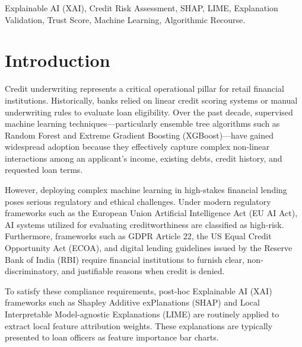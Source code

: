 \documentclass[conference]{IEEEtran}
\begin{document}
\begin{IEEEkeywords}
Explainable AI (XAI), Credit Risk Assessment, SHAP, LIME, Explanation Validation, Trust Score, Machine Learning, Algorithmic Recourse.
\end{IEEEkeywords}

\section{Introduction}
Credit underwriting represents a critical operational pillar for retail financial institutions. Historically, banks relied on linear credit scoring systems or manual underwriting rules to evaluate loan eligibility. Over the past decade, supervised machine learning techniques---particularly ensemble tree algorithms such as Random Forest and Extreme Gradient Boosting (XGBoost)---have gained widespread adoption because they effectively capture complex non-linear interactions among an applicant's income, existing debts, credit history, and requested loan terms.

However, deploying complex machine learning in high-stakes financial lending poses serious regulatory and ethical challenges. Under modern regulatory frameworks such as the European Union Artificial Intelligence Act (EU AI Act), AI systems utilized for evaluating creditworthiness are classified as high-risk. Furthermore, frameworks such as GDPR Article 22, the US Equal Credit Opportunity Act (ECOA), and digital lending guidelines issued by the Reserve Bank of India (RBI) require financial institutions to furnish clear, non-discriminatory, and justifiable reasons when credit is denied.

To satisfy these compliance requirements, post-hoc Explainable AI (XAI) frameworks such as Shapley Additive exPlanations (SHAP) \cite{lundberg2017} and Local Interpretable Model-agnostic Explanations (LIME) \cite{ribeiro2016} are routinely applied to extract local feature attribution weights. These explanations are typically presented to loan officers as feature importance bar charts.
\end{document}
